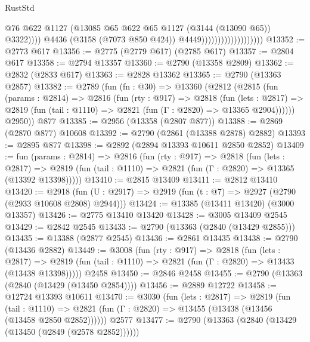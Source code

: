 \begin{lexlean}{RustStd}
\begin{coremodule}
{\begin{coremodule}
{{{{{{{{{{{{{{{{{{{{{{{{{{                                                @76
                                                @622
                                                @1127
                                                (@13085
                                                  @65
                                                  @622
                                                  @65
                                                  @1127
                                                  (@3144 (@13090 @65))
                                                  @3322))))
                                          @4436
                                          (@3158 (@7073 @850 @424))
                                          @4449)))))))))))))))))))
@13352 := @2773 @617
@13356 := @2775 (@2779 @617) (@2785 @617)
@13357 := @2804 @617
@13358 := @2794 @13357
@13360 := @2790 (@13358 @2809)
@13362 := @2832 (@2833 @617)
@13363 := @2828 @13362
@13365 := @2790 (@13363 @2857)
@13382 := @2789
    (fun (fn : @30) =>
    @13360
      (@2812
        (@2815
          (fun (params : @2814) =>
          @2816
            (fun (rty : @917) =>
            @2818
              (fun (lets : @2817) =>
              @2819 (fun (tail : @1110) => @2821 (fun (Γ : @2820) => @13365 @2904))))))
        @2950))
    @877
@13385 := @2956 (@13358 (@2807 @877))
@13388 := @2869 (@2870 @877) @10608
@13392 := @2790 (@2861 (@13388 @2878) @2882)
@13393 := @2895 @877
@13398 := @2892 (@2894 @13393 @10611 @2850 @2852)
@13409 := fun (params : @2814) =>
  @2816
    (fun (rty : @917) =>
    @2818
      (fun (lets : @2817) =>
      @2819 (fun (tail : @1110) => @2821 (fun (Γ : @2820) => @13365 (@13392 @13398)))))
@13410 := @2815 @13409
@13411 := @2812 @13410
@13420 := @2918
    (fun (U : @2917) => @2919 (fun (t : @7) => @2927 (@2790 (@2933 @10608 @2808) @2944)))
@13424 := @13385 (@13411 @13420) (@3000 @13357)
@13426 := @2775 @13410 @13420
@13428 := @3005 @13409 @2545
@13429 := @2842 @2545
@13433 := @2790 (@13363 (@2840 (@13429 @2855)))
@13435 := @13388 (@2877 @2545)
@13436 := @2861 @13435
@13438 := @2790 (@13436 @2882)
@13449 := @3008
    (fun (rty : @917) =>
    @2818
      (fun (lets : @2817) =>
      @2819 (fun (tail : @1110) => @2821 (fun (Γ : @2820) => @13433 (@13438 @13398)))))
    @2458
@13450 := @2846 @2458
@13455 := @2790 (@13363 (@2840 (@13429 (@13450 @2854))))
@13456 := @2889 @12722
@13458 := @12724 @13393 @10611
@13470 := @3030
    (fun (lets : @2817) =>
    @2819
      (fun (tail : @1110) =>
      @2821 (fun (Γ : @2820) => @13455 (@13438 (@13456 (@13458 @2850 @2852))))))
    @2577
@13477 := @2790 (@13363 (@2840 (@13429 (@13450 (@2849 (@2578 @2852))))))
}}}}}}}}}}}}}}}}}}}}}}}}}}
\end{coremodule}}
\end{coremodule}
\end{lexlean}
